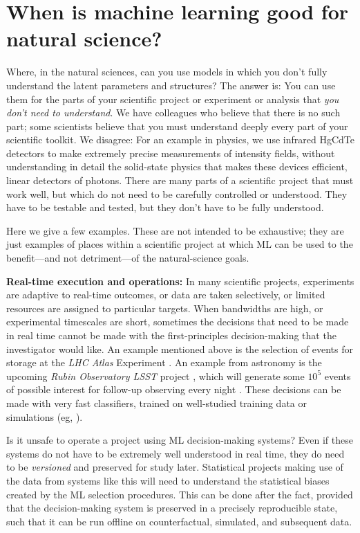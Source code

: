 \documentclass{article}
\renewcommand{\paragraph}[1]{\noindent\par\textbf{#1}}
\begin{document}
\section{When is machine learning good for natural science?}\label{sec:good}
Where, in the natural sciences, can you use models in which you don't fully understand the latent parameters and structures?
The answer is: You can use them for the parts of your scientific project or experiment or analysis that \emph{you don't need to understand}.
We have colleagues who believe that there is no such part; some scientists believe that you must understand deeply every part of your scientific toolkit.
We disagree: For an example in physics, we use infrared HgCdTe detectors \cite{hgcdte} to make extremely precise measurements of intensity fields, without understanding in detail the solid-state physics that makes these devices efficient, linear detectors of photons.
There are many parts of a scientific project that must work well, but which do not need to be carefully controlled or understood.
They have to be testable and tested, but they don't have to be fully understood.

Here we give a few examples.
These are not intended to be exhaustive; they are just examples of places within a scientific project at which ML can be used to the benefit---and not detriment---of the natural-science goals.

\paragraph{Real-time execution and operations:}
In many scientific projects, experiments are adaptive to real-time outcomes, or data are taken selectively, or limited resources are assigned to particular targets.
When bandwidths are high, or experimental timescales are short, sometimes the decisions that need to be made in real time cannot be made with the first-principles decision-making that the investigator would like.
An example mentioned above is the selection of events for storage at the \textsl{LHC Atlas} Experiment \cite{atlas}.
An example from astronomy is the upcoming \textsl{Rubin Observatory LSST} project \cite{rubin}, which will generate some $10^5$ events of possible interest for follow-up observing every night \cite{lsst_events}.
These decisions can be made with very fast classifiers, trained on well-studied training data or simulations (eg, \citealt{lsst_broker}).

Is it unsafe to operate a project using ML decision-making systems?
Even if these systems do not have to be extremely well understood in real time, they do need to be \emph{versioned} and preserved for study later.
Statistical projects making use of the data from systems like this will need to understand the statistical biases created by the ML selection procedures.
This can be done after the fact, provided that the decision-making system is preserved in a precisely reproducible state, such that it can be run offline on counterfactual, simulated, and subsequent data.
\end{document}
